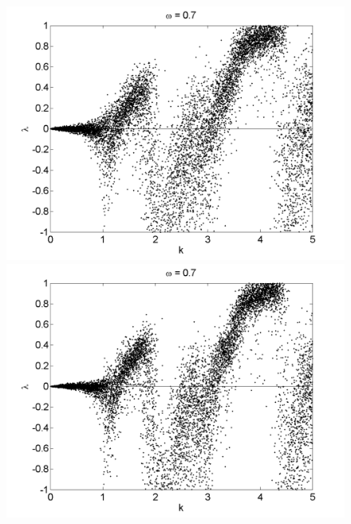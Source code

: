 \begin{figure}[!h]
\includegraphics[width=.5\textwidth]{figs/rcirc_n_lyap_L_05_k_10000.png}\hfill
\includegraphics[width=.5\textwidth]{figs/rcirc_n_lyap_L_07_k_10000.png}\\
\end{figure}

